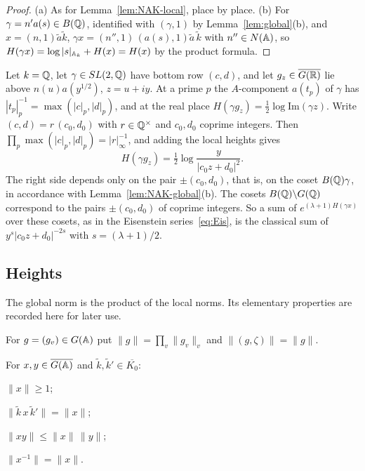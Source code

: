 \begin{proof}
(a) As for Lemma~\ref{lem:NAK-local}, place by place. (b) For
$\gamma=n'a(s)\in B(\mathbb{Q})$, identified with $(\gamma,1)$ by
Lemma~\ref{lem:global}(b), and $x=(n,1)\tilde a\tilde k$,
$\gamma x=(n'',1)\,(a(s),1)\tilde a\,\tilde k$ with $n''\in N(\mathbb{A})$, so
$H(\gamma x)=\log|s|_{\mathbb{A}_k}+H(x)=H(x)$ by the product formula.
\end{proof}

\begin{example}\label{ex:nak-global}
Let $k=\mathbb{Q}$, let $\gamma\in SL(2,\mathbb{Q})$ have bottom row $(c,d)$, and let
$g_z\in\overline{G(\mathbb{R})}$ lie above $n(u)a(y^{1/2})$, $z=u+iy$. At a prime
$p$ the $A$-component $a(t_p)$ of $\gamma$ has $|t_p|_p^{-1}=
\max(|c|_p,|d|_p)$, and at the real place $H(\gamma g_z)=\frac12\log
\mathrm{Im}(\gamma z)$. Write $(c,d)=r\,(c_0,d_0)$ with $r\in\mathbb{Q}^\times$ and
$c_0,d_0$ coprime integers. Then $\prod_p\max(|c|_p,|d|_p)=|r|_\infty^{-1}$,
and adding the local heights gives
\[
H(\gamma g_z)=\tfrac12\log\frac{y}{|c_0z+d_0|^2}.
\]
The right side depends only on the pair $\pm(c_0,d_0)$, that is, on the
coset $B(\mathbb{Q})\gamma$, in accordance with Lemma~\ref{lem:NAK-global}(b).
The cosets $B(\mathbb{Q})\backslash G(\mathbb{Q})$ correspond to the pairs $\pm(c_0,d_0)$
of coprime integers. So a sum of $e^{(\lambda+1)H(\gamma x)}$ over these
cosets, as in the Eisenstein series~\eqref{eq:Eis}, is the classical sum
of $y^s|c_0z+d_0|^{-2s}$ with $s=(\lambda+1)/2$.
\end{example}

\subsection{Heights}

The global norm is the product of the local norms. Its elementary
properties are recorded here for later use.


For $g=(g_v)\in G(\mathbb{A})$ put $\|g\|=\prod_v\|g_v\|_v$ and
$\|(g,\zeta)\|=\|g\|$.

\begin{lemma}\label{lem:heights}
For $x,y\in\overline{G(\mathbb{A})}$ and $\tilde k,\tilde k'\in\overline{K_0}$:
\begin{enumerate*}[label=(\alph*)]
\item $\|x\|\ge1$;
\item $\|\tilde k\,x\,\tilde k'\|=\|x\|$;
\item $\|xy\|\le\|x\|\,\|y\|$;
\item $\|x^{-1}\|=\|x\|$.
\end{enumerate*}
\end{lemma}

